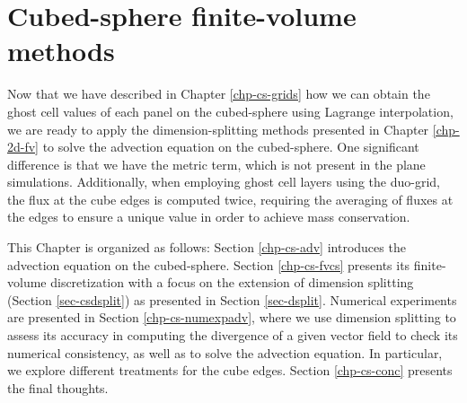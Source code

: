 \chapter{Cubed-sphere finite-volume methods}
\label{chp-cs-fv}
Now that we have described in Chapter \ref{chp-cs-grids} how we can obtain the ghost cell values of each panel on the cubed-sphere using Lagrange interpolation, we are ready to apply the dimension-splitting methods presented in Chapter \ref{chp-2d-fv} to solve the advection equation on the cubed-sphere.
One significant difference is that we have the metric term, which is not present in the plane simulations.
Additionally, when employing ghost cell layers using the duo-grid, the flux at the cube edges is computed twice, 
requiring the averaging of fluxes at the edges to ensure a unique value in order to achieve mass conservation.


This Chapter is organized as follows: Section \ref{chp-cs-adv} introduces the advection equation on the cubed-sphere.
Section \ref{chp-cs-fvcs} presents its finite-volume discretization with a focus on the extension of dimension splitting (Section \ref{sec-csdsplit}) 
as presented in Section \ref{sec-dsplit}.
Numerical experiments are presented in Section \ref{chp-cs-numexpadv}, where we use dimension splitting to assess its
accuracy in computing the divergence of a given vector field to check its numerical consistency, as well as to solve the advection equation.
In particular, we explore different treatments for the cube edges. Section \ref{chp-cs-conc} presents the final thoughts.

